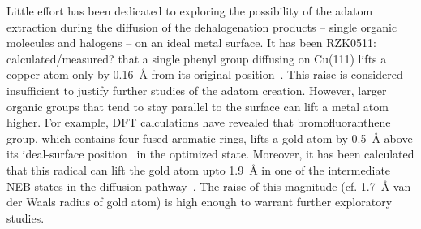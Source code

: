 \documentclass[%
 reprint,
 amsmath,amssymb,
 aps,
prb,
floatfix,
]{revtex4-2}
\newcommand{\lock}{\color{red}}
\newcommand{\lock}{\color{red}}
\newcommand{\comm}{\color{Purple}} %
\begin{document}
{\lock

Little effort has been dedicated to exploring the possibility of the adatom extraction during the diffusion of the dehalogenation products  -- single organic molecules and halogens -- on an ideal metal surface. 
%
%
It has been {\comm RZK0511: calculated/measured?} that a single phenyl group diffusing on Cu(111) lifts a copper atom only by \SI{0.16}{\angstrom} from its original position~\cite{pccp2010}. 
This raise is considered insufficient to justify further studies of the adatom creation.
However, larger organic groups that tend to stay parallel to the surface can lift a metal atom higher. 
For example, DFT calculations have revealed that bromofluoranthene group, which contains four fused aromatic rings, lifts a gold atom by \SI{0.5}{\angstrom} above its ideal-surface position~\cite{jpcc2018} in the optimized state. 
Moreover, it has been calculated that this radical can lift the gold atom upto \SI{1.9}{\angstrom} in one of the intermediate NEB states in the diffusion pathway~\cite{jpcc2018}.
The raise of this magnitude (cf. \SI{1.7}{\angstrom} van der Waals radius of gold atom) is high enough to warrant further exploratory studies.


}


\end{document}
